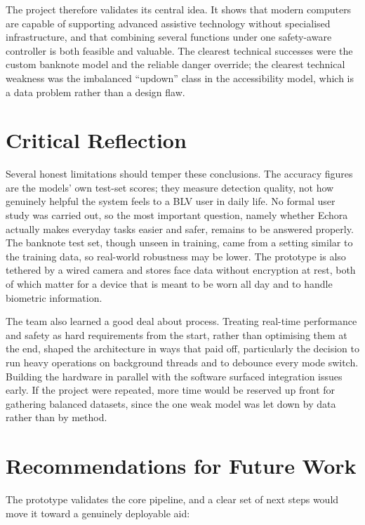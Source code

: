 The project therefore validates its central idea. It shows that modern computers are capable of supporting advanced assistive technology without specialised infrastructure, and that combining several functions under one safety-aware controller is both feasible and valuable. The clearest technical successes were the custom banknote model and the reliable danger override; the clearest technical weakness was the imbalanced ``updown'' class in the accessibility model, which is a data problem rather than a design flaw.

\section{Critical Reflection}

Several honest limitations should temper these conclusions. The accuracy figures are the models' own test-set scores; they measure detection quality, not how genuinely helpful the system feels to a BLV user in daily life. No formal user study was carried out, so the most important question, namely whether Echora actually makes everyday tasks easier and safer, remains to be answered properly. The banknote test set, though unseen in training, came from a setting similar to the training data, so real-world robustness may be lower. The prototype is also tethered by a wired camera and stores face data without encryption at rest, both of which matter for a device that is meant to be worn all day and to handle biometric information.

The team also learned a good deal about process. Treating real-time performance and safety as hard requirements from the start, rather than optimising them at the end, shaped the architecture in ways that paid off, particularly the decision to run heavy operations on background threads and to debounce every mode switch. Building the hardware in parallel with the software surfaced integration issues early. If the project were repeated, more time would be reserved up front for gathering balanced datasets, since the one weak model was let down by data rather than by method.

\section{Recommendations for Future Work}

The prototype validates the core pipeline, and a clear set of next steps would move it toward a genuinely deployable aid:


